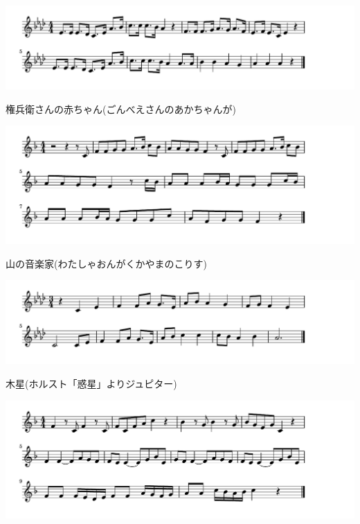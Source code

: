 \documentclass[a4paper]{ltjsarticle}
\begin{document}
\includegraphics[clip]{gonbe_crop.pdf}

\vspace{-10mm} \hspace{10mm}
権兵衛さんの赤ちゃん(ごんべえさんのあかちゃんが)

\includegraphics[clip]{yamanoongakuka_crop.pdf}

\vspace{-10mm} \hspace{10mm}
山の音楽家(わたしゃおんがくかやまのこりす)

\includegraphics[clip]{mokusei_crop.pdf}

\vspace{-10mm} \hspace{10mm}
木星(ホルスト「惑星」よりジュピター)

\includegraphics[clip]{eineclinenacht_crop.pdf}
\end{document}
